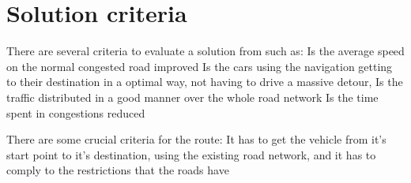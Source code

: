\section{Solution criteria}

There are several criteria to evaluate a solution from such as:
Is the average speed on the normal congested road improved
Is the cars using the navigation getting to their destination in a optimal way, not having to drive a massive detour,
Is the traffic distributed in a good manner over the whole road network
Is the time spent in congestions reduced


There are some crucial criteria for the route:
It has to get the vehicle from it's start point to it's destination, using the existing road network, and it has to comply to the restrictions that the roads have